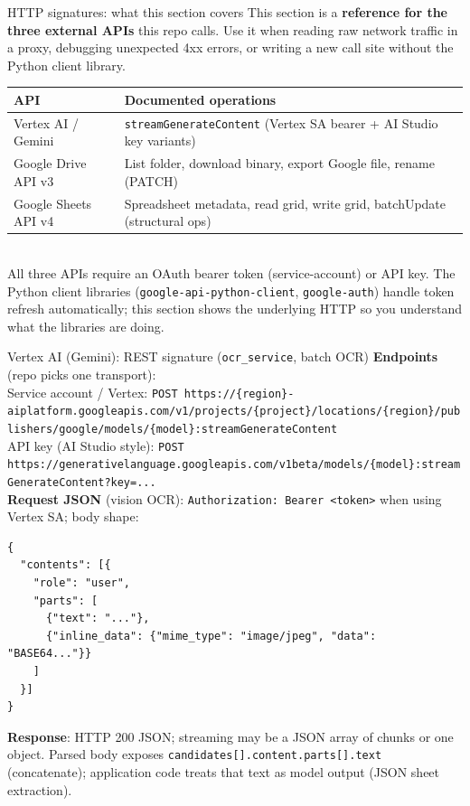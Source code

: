 \documentclass[aspectratio=169]{beamer}
\begin{document}
\begin{frame}{HTTP signatures: what this section covers}
  \small
  This section is a \textbf{reference for the three external APIs} this repo calls.
  Use it when reading raw network traffic in a proxy, debugging unexpected 4xx errors,
  or writing a new call site without the Python client library.\\[0.4em]
  \begin{tabular}{@{}p{3.0cm}p{10.7cm}@{}}
    \toprule
    API & Documented operations \\
    \midrule
    Vertex AI / Gemini & \texttt{streamGenerateContent} (Vertex SA bearer + AI Studio key variants) \\
    Google Drive API v3 & List folder, download binary, export Google file, rename (PATCH) \\
    Google Sheets API v4 & Spreadsheet metadata, read grid, write grid, batchUpdate (structural ops) \\
    \bottomrule
  \end{tabular}
  \vspace{0.3em}\\
  \footnotesize All three APIs require an OAuth bearer token (service-account) or API key. The Python client libraries (\texttt{google-api-python-client}, \texttt{google-auth}) handle token refresh automatically; this section shows the underlying HTTP so you understand what the libraries are doing.
\end{frame}

\begin{frame}[fragile]{Vertex AI (Gemini): REST signature (\texttt{ocr\_service}, batch OCR)}
  \tiny
  \textbf{Endpoints} (repo picks one transport):\\
  Service account / Vertex: \texttt{POST https://\{region\}-aiplatform.googleapis.com/v1/projects/\{project\}/locations/\{region\}/publishers/google/models/\{model\}:streamGenerateContent}\\
  API key (AI Studio style): \texttt{POST https://generativelanguage.googleapis.com/v1beta/models/\{model\}:streamGenerateContent?key=...}\\[0.35em]
  \textbf{Request JSON} (vision OCR): \texttt{Authorization: Bearer <token>} when using Vertex SA; body shape:
\begin{lstlisting}[style=py]
{
  "contents": [{
    "role": "user",
    "parts": [
      {"text": "..."},
      {"inline_data": {"mime_type": "image/jpeg", "data": "BASE64..."}}
    ]
  }]
}
\end{lstlisting}
  \textbf{Response}: HTTP 200 JSON; streaming may be a JSON array of chunks or one object. Parsed body exposes \texttt{candidates[].content.parts[].text} (concatenate); application code treats that text as model output (JSON sheet extraction).
\end{frame}
\end{document}
